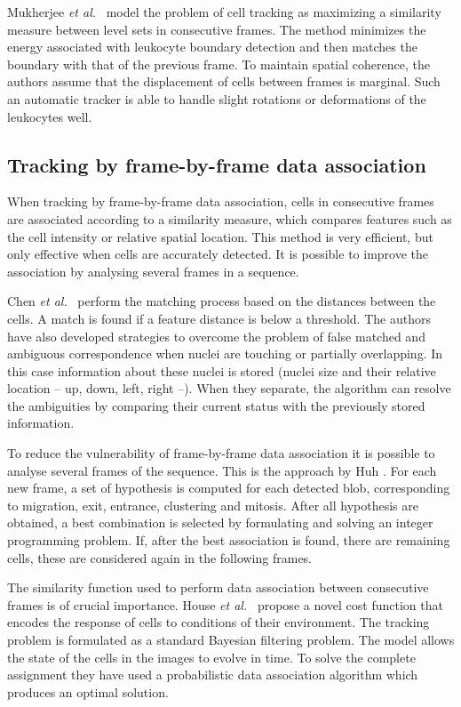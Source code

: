 Mukherjee \emph{et al.}~\cite{mukherjee04} model the problem of cell tracking as maximizing a similarity measure between level sets in consecutive frames. The method minimizes the energy associated with leukocyte boundary detection and then matches the boundary with that of the previous frame. To maintain spatial coherence, the authors assume that the displacement of cells between frames is marginal. Such an automatic tracker is able to handle slight rotations or deformations of the leukocytes well.

\subsection{Tracking by frame-by-frame data association \statusfirstdraft}

When tracking by frame-by-frame data association, cells in consecutive frames are associated according to a similarity measure, which compares features such as the cell intensity or relative spatial location. This method is very efficient, but only effective when cells are accurately detected. It is possible to improve the association by analysing several frames in a sequence.

Chen \emph{et al.}~\cite{chen06} perform the matching process based on the distances between the cells. A match is found if a feature distance is below a threshold. The authors have also developed strategies to overcome the problem of false matched and ambiguous correspondence when nuclei are touching or partially overlapping. In this case information about these nuclei is stored (nuclei size and their relative location -- up, down, left, right --). When they separate, the algorithm can resolve the ambiguities by comparing their current status with the previously stored information.

To reduce the vulnerability of frame-by-frame data association it is possible to analyse several frames of the sequence. This is the approach by Huh \cite{huh13}. For each new frame, a set of hypothesis is computed for each detected blob, corresponding to migration, exit, entrance, clustering and mitosis. After all hypothesis are obtained, a best combination is selected by formulating and solving an integer programming problem. If, after the best association is found, there are remaining cells, these are considered again in the following frames.

The similarity function used to perform data association between consecutive frames is of crucial importance. House \emph{et al.}~\cite{house09} propose a novel cost function that encodes the response of cells to conditions of their environment. The tracking problem is formulated as a standard Bayesian filtering problem. The model allows the state of the cells in the images to evolve in time. To solve the complete assignment they have used a probabilistic data association algorithm which produces an optimal solution.

